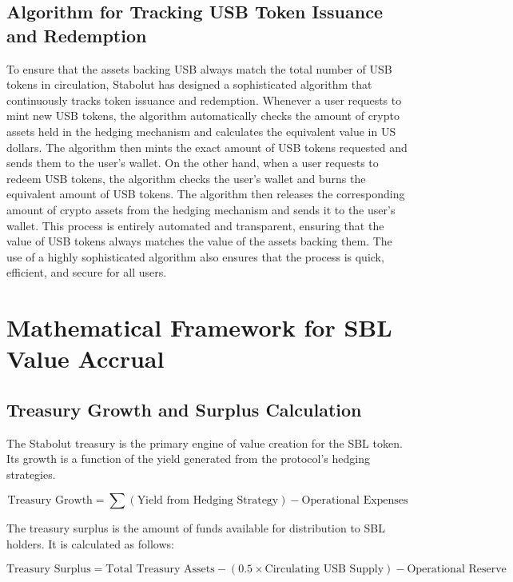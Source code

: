 \subsection{Algorithm for Tracking USB Token Issuance and Redemption}
To ensure that the assets backing USB always match the total number of USB tokens in circulation, Stabolut has designed a sophisticated algorithm that continuously tracks token issuance and redemption.\newline
Whenever a user requests to mint new USB tokens, the algorithm automatically checks the amount of crypto assets held in the hedging mechanism and calculates the equivalent value in US dollars.
The algorithm then mints the exact amount of USB tokens requested and sends them to the user's wallet.\newline
On the other hand, when a user requests to redeem USB tokens, the algorithm checks the user's wallet and burns the equivalent amount of USB tokens.
The algorithm then releases the corresponding amount of crypto assets from the hedging mechanism and sends it to the user's wallet.\newline
This process is entirely automated and transparent, ensuring that the value of USB tokens always matches the value of the assets backing them. 
The use of a highly sophisticated algorithm also ensures that the process is quick, efficient, and secure for all users.\newline

\section{Mathematical Framework for SBL Value Accrual}

\subsection{Treasury Growth and Surplus Calculation}
The Stabolut treasury is the primary engine of value creation for the SBL token. Its growth is a function of the yield generated from the protocol's hedging strategies.

\begin{equation}
\text{Treasury Growth} = \sum (\text{Yield from Hedging Strategy}) - \text{Operational Expenses}
\end{equation}

The treasury surplus is the amount of funds available for distribution to SBL holders. It is calculated as follows:

\begin{equation}
\text{Treasury Surplus} = \text{Total Treasury Assets} - (0.5 \times \text{Circulating USB Supply}) - \text{Operational Reserve}
\end{equation}

